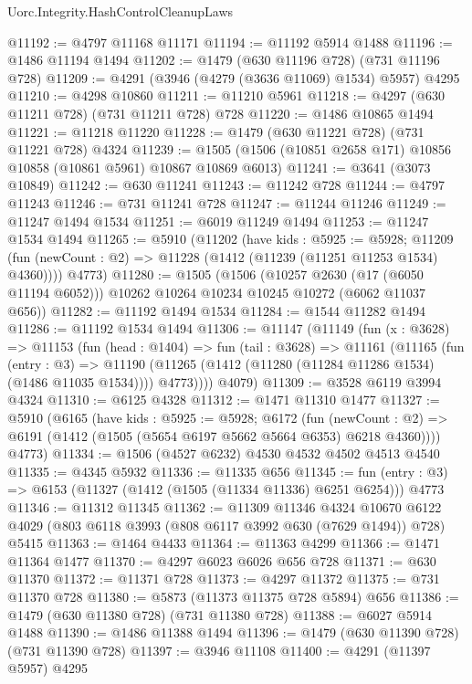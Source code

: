 \begin{lexlean}{Uorc.Integrity.HashControlCleanupLaws}
\begin{coremodule}
@11192 := @4797 @11168 @11171
@11194 := @11192 @5914 @1488
@11196 := @1486 @11194 @1494
@11202 := @1479 (@630 @11196 @728) (@731 @11196 @728)
@11209 := @4291 (@3946 (@4279 (@3636 @11069) @1534) @5957) @4295
@11210 := @4298 @10860
@11211 := @11210 @5961
@11218 := @4297 (@630 @11211 @728) (@731 @11211 @728) @728
@11220 := @1486 @10865 @1494
@11221 := @11218 @11220
@11228 := @1479 (@630 @11221 @728) (@731 @11221 @728) @4324
@11239 := @1505 (@1506 (@10851 @2658 @171) @10856 @10858 (@10861 @5961) @10867 @10869 @6013)
@11241 := @3641 (@3073 @10849)
@11242 := @630 @11241
@11243 := @11242 @728
@11244 := @4797 @11243
@11246 := @731 @11241 @728
@11247 := @11244 @11246
@11249 := @11247 @1494 @1534
@11251 := @6019 @11249 @1494
@11253 := @11247 @1534 @1494
@11265 := @5910
    (@11202
      (have kids : @5925 := @5928;
      @11209 (fun (newCount : @2) => @11228 (@1412 (@11239 (@11251 @11253 @1534) @4360))))
      @4773)
@11280 := @1505
    (@1506
      (@10257 @2630 (@17 (@6050 @11194 @6052)))
      @10262
      @10264
      @10234
      @10245
      @10272
      (@6062 @11037 @656))
@11282 := @11192 @1494 @1534
@11284 := @1544 @11282 @1494
@11286 := @11192 @1534 @1494
@11306 := @11147
    (@11149
      (fun (x : @3628) =>
      @11153
        (fun (head : @1404) =>
        fun (tail : @3628) =>
        @11161
          (@11165
            (fun (entry : @3) =>
            @11190 (@11265 (@1412 (@11280 (@11284 @11286 @1534) (@1486 @11035 @1534)))) @4773))))
      @4079)
@11309 := @3528 @6119 @3994 @4324
@11310 := @6125 @4328
@11312 := @1471 @11310 @1477
@11327 := @5910
    (@6165
      (have kids : @5925 := @5928;
      @6172
        (fun (newCount : @2) => @6191 (@1412 (@1505 (@5654 @6197 @5662 @5664 @6353) @6218 @4360))))
      @4773)
@11334 := @1506 (@4527 @6232) @4530 @4532 @4502 @4513 @4540
@11335 := @4345 @5932
@11336 := @11335 @656
@11345 := fun (entry : @3) => @6153 (@11327 (@1412 (@1505 (@11334 @11336) @6251 @6254))) @4773
@11346 := @11312 @11345
@11362 := @11309
    @11346
    @4324
    @10670
    @6122
    @4029
    (@803 @6118 @3993 (@808 @6117 @3992 @630 (@7629 @1494)) @728)
    @5415
@11363 := @1464 @4433
@11364 := @11363 @4299
@11366 := @1471 @11364 @1477
@11370 := @4297 @6023 @6026 @656 @728
@11371 := @630 @11370
@11372 := @11371 @728
@11373 := @4297 @11372
@11375 := @731 @11370 @728
@11380 := @5873 (@11373 @11375 @728 @5894) @656
@11386 := @1479 (@630 @11380 @728) (@731 @11380 @728)
@11388 := @6027 @5914 @1488
@11390 := @1486 @11388 @1494
@11396 := @1479 (@630 @11390 @728) (@731 @11390 @728)
@11397 := @3946 @11108
@11400 := @4291 (@11397 @5957) @4295

\end{coremodule}
\end{lexlean}
